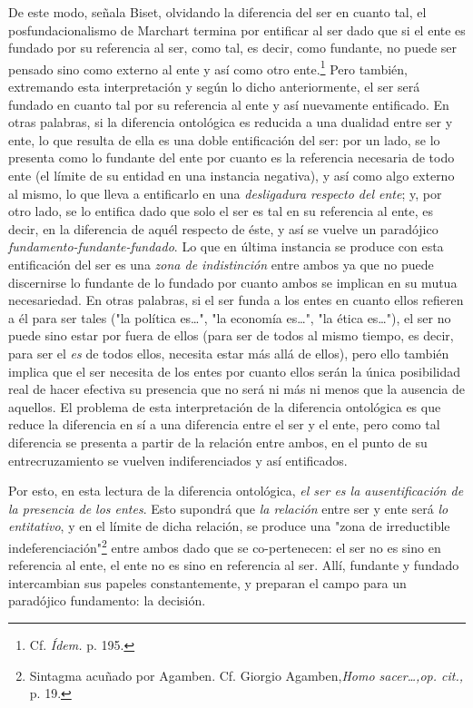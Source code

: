 \documentclass{book}
\begin{document}
De este modo, señala Biset, olvidando la diferencia del ser en cuanto
tal, el posfundacionalismo de Marchart termina por entificar al ser dado
que si el ente es fundado por su referencia al ser, como tal, es decir,
como fundante, no puede ser pensado sino como externo al ente y así como
otro ente.\footnote{Cf. \emph{Ídem.} p. 195.} Pero también, extremando
esta interpretación y según lo dicho anteriormente, el ser será fundado
en cuanto tal por su referencia al ente y así nuevamente entificado. En
otras palabras, si la diferencia ontológica es reducida a una dualidad
entre ser y ente, lo que resulta de ella es una doble entificación del
ser: por un lado, se lo presenta como lo fundante del ente por cuanto es
la referencia necesaria de todo ente (el límite de su entidad en una
instancia negativa), y así como algo externo al mismo, lo que lleva a
entificarlo en una \emph{desligadura respecto del ente}; y, por otro
lado, se lo entifica dado que solo el ser es tal en su referencia al
ente, es decir, en la diferencia de aquél respecto de éste, y así se
vuelve un paradójico \emph{fundamento-fundante-fundado}. Lo que en
última instancia se produce con esta entificación del ser es una
\emph{zona de indistinción} entre ambos ya que no puede discernirse lo
fundante de lo fundado por cuanto ambos se implican en su mutua
necesariedad. En otras palabras, si el ser funda a los entes en cuanto
ellos refieren a él para ser tales ("la política es\ldots", "la economía
es\ldots", "la ética es\ldots"), el ser no puede sino estar por fuera de
ellos (para ser de todos al mismo tiempo, es decir, para ser el
\emph{es} de todos ellos, necesita estar más allá de ellos), pero ello
también implica que el ser necesita de los entes por cuanto ellos serán
la única posibilidad real de hacer efectiva su presencia que no será ni
más ni menos que la ausencia de aquellos. El problema de esta
interpretación de la diferencia ontológica es que reduce la diferencia
en sí a una diferencia entre el ser y el ente, pero como tal diferencia
se presenta a partir de la relación entre ambos, en el punto de su
entrecruzamiento se vuelven indiferenciados y así entificados.

Por esto, en esta lectura de la diferencia ontológica, \emph{el ser es
la ausentificación de la presencia de los entes}. Esto supondrá que
\emph{la relación} entre ser y ente será \emph{lo entitativo}, y en el
límite de dicha relación, se produce una "zona de irreductible
indeferenciación"\footnote{Sintagma acuñado por Agamben. Cf. Giorgio
  Agamben,\emph{Homo sacer\ldots,op. cit.,} p. 19.} entre ambos dado que
se co-pertenecen: el ser no es sino en referencia al ente, el ente no es
sino en referencia al ser. Allí, fundante y fundado intercambian sus
papeles constantemente, y preparan el campo para un paradójico
fundamento: la decisión.
\end{document}
